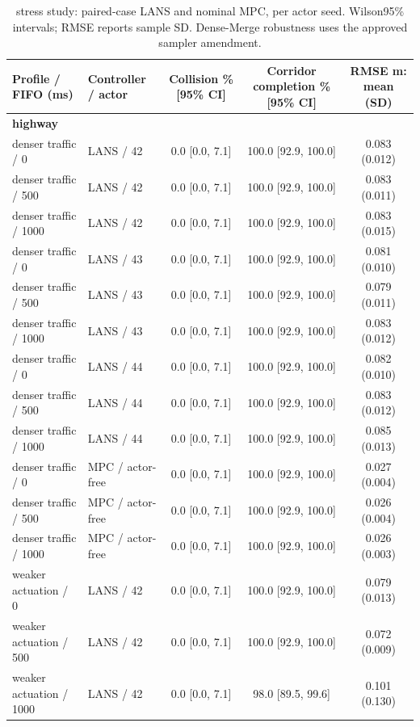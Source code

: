 \begin{longtable}{llccc}
\caption{stress study: paired-case LANS and nominal MPC, per actor seed. Wilson95\% intervals; RMSE reports sample SD. Dense-Merge robustness uses the approved sampler amendment.}\\
\toprule
Profile / FIFO (ms) & Controller / actor & Collision \% [95\% CI] & Corridor completion \% [95\% CI] & RMSE m: mean (SD) \\
\midrule
\multicolumn{5}{l}{\textbf{highway}} \\
denser traffic / 0 & LANS / 42 & 0.0 [0.0, 7.1] & 100.0 [92.9, 100.0] & 0.083 (0.012) \\
denser traffic / 500 & LANS / 42 & 0.0 [0.0, 7.1] & 100.0 [92.9, 100.0] & 0.083 (0.011) \\
denser traffic / 1000 & LANS / 42 & 0.0 [0.0, 7.1] & 100.0 [92.9, 100.0] & 0.083 (0.015) \\
denser traffic / 0 & LANS / 43 & 0.0 [0.0, 7.1] & 100.0 [92.9, 100.0] & 0.081 (0.010) \\
denser traffic / 500 & LANS / 43 & 0.0 [0.0, 7.1] & 100.0 [92.9, 100.0] & 0.079 (0.011) \\
denser traffic / 1000 & LANS / 43 & 0.0 [0.0, 7.1] & 100.0 [92.9, 100.0] & 0.083 (0.012) \\
denser traffic / 0 & LANS / 44 & 0.0 [0.0, 7.1] & 100.0 [92.9, 100.0] & 0.082 (0.010) \\
denser traffic / 500 & LANS / 44 & 0.0 [0.0, 7.1] & 100.0 [92.9, 100.0] & 0.083 (0.012) \\
denser traffic / 1000 & LANS / 44 & 0.0 [0.0, 7.1] & 100.0 [92.9, 100.0] & 0.085 (0.013) \\
denser traffic / 0 & MPC / actor-free & 0.0 [0.0, 7.1] & 100.0 [92.9, 100.0] & 0.027 (0.004) \\
denser traffic / 500 & MPC / actor-free & 0.0 [0.0, 7.1] & 100.0 [92.9, 100.0] & 0.026 (0.004) \\
denser traffic / 1000 & MPC / actor-free & 0.0 [0.0, 7.1] & 100.0 [92.9, 100.0] & 0.026 (0.003) \\
weaker actuation / 0 & LANS / 42 & 0.0 [0.0, 7.1] & 100.0 [92.9, 100.0] & 0.079 (0.013) \\
weaker actuation / 500 & LANS / 42 & 0.0 [0.0, 7.1] & 100.0 [92.9, 100.0] & 0.072 (0.009) \\
weaker actuation / 1000 & LANS / 42 & 0.0 [0.0, 7.1] & 98.0 [89.5, 99.6] & 0.101 (0.130) \\

\end{longtable}
